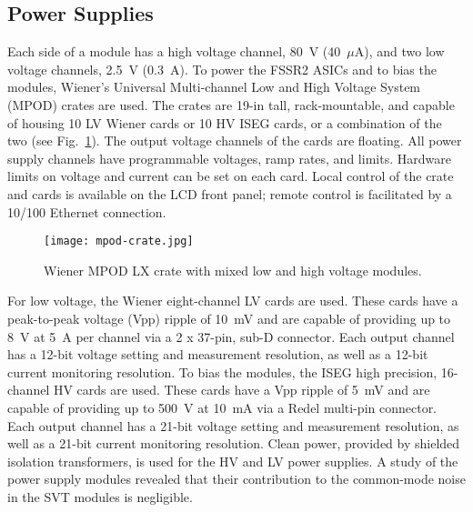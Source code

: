 \subsection{Power Supplies}

Each side of a module has a high voltage channel, 80~V (40~$\mu$A), and two low voltage channels, 2.5~V (0.3~A). To
power the FSSR2 ASICs and to bias the modules, Wiener's Universal Multi-channel Low and High Voltage System
(MPOD) crates are used. The crates are 19-in tall, rack-mountable, and capable of housing 10 LV Wiener cards or 10
HV ISEG cards, or a combination of the two (see Fig.~\ref{fig:mpod-crate}). The output voltage channels of the
cards are floating. All power supply channels have programmable voltages, ramp rates, and limits. Hardware limits on
voltage and current can be set on each card. Local control of the crate and cards is available on the LCD front panel;
remote control is facilitated by a 10/100 Ethernet connection. 

\begin{figure}[hbt] 
\centering 
\texttt{[image: mpod-crate.jpg]}
\caption{Wiener MPOD LX crate with mixed low and high voltage modules.}
\label{fig:mpod-crate}
\end{figure}

For low voltage, the Wiener eight-channel LV cards are used. These cards have a peak-to-peak voltage (Vpp)
ripple of 10~mV and are capable of providing up to 8~V at 5~A per channel via a 2 x 37-pin, sub-D connector. Each
output channel has a 12-bit voltage setting and measurement resolution, as well as a 12-bit current monitoring
resolution. To bias the modules, the ISEG high precision, 16-channel HV cards are used. These cards have a
Vpp ripple of 5~mV and are capable of providing up to 500~V at 10~mA via a Redel multi-pin connector. Each output
channel has a 21-bit voltage setting and measurement resolution, as well as a 21-bit current monitoring resolution.
Clean power, provided by shielded isolation transformers, is used for the HV and LV power supplies. A study
of the power supply modules revealed that their contribution to the common-mode noise in the SVT modules
is negligible.

